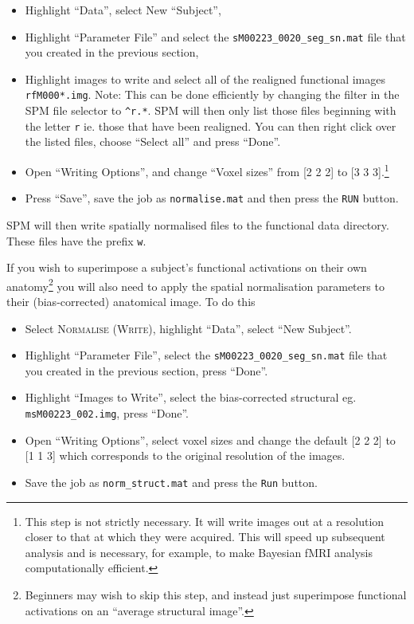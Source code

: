 \begin{itemize}
\item Highlight ``Data'', select New ``Subject'',
\item Highlight ``Parameter File'' and select the \texttt{sM00223\_0020\_seg\_sn.mat} file that you created in the previous section,
\item Highlight images to write and select all of the realigned functional images \texttt{rfM000*.img}. Note: This can be done efficiently by changing the filter in the SPM file selector to \texttt{\textasciicircum r.*}. SPM will then only list those files beginning with the letter \texttt{r} ie. those that have been realigned. You can then right click over the listed files, choose ``Select all'' and press ``Done''.
\item Open ``Writing Options'', and change ``Voxel sizes'' from [2 2 2] to [3 3 3].\footnote{This step is not strictly necessary. It will write images out at a resolution closer to that at which they were acquired. This will speed up subsequent analysis and is necessary, for example, to make Bayesian fMRI analysis computationally efficient.}
\item Press ``Save'', save the job as \texttt{normalise.mat} and then press the \texttt{RUN} button.
\end{itemize}

SPM will then write spatially normalised files to the functional data directory. These files have the prefix \texttt{w}.

If you wish to superimpose a subject's functional activations on their own anatomy\footnote{Beginners may wish to skip this step, and instead just superimpose functional activations on an ``average structural image''.} you will also need to apply the spatial normalisation parameters to their (bias-corrected) anatomical image. To do this

\begin{itemize}
\item Select \textsc{Normalise (Write)}, highlight ``Data'', select ``New Subject''.
\item Highlight ``Parameter File'', select the  \texttt{sM00223\_0020\_seg\_sn.mat} file that you created in the previous section, press ``Done''.
\item Highlight ``Images to Write'', select the bias-corrected structural eg. \texttt{msM00223\_002.img}, press ``Done''.
\item Open ``Writing Options'', select voxel sizes and change the default [2 2 2] to [1 1 3] which corresponds to the original resolution of the images.
\item Save the job as \texttt{norm\_struct.mat} and press the \texttt{Run} button.
\end{itemize}

